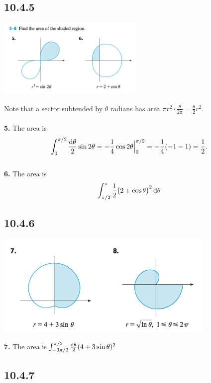 \subsection*{10.4.5}
\includegraphics[width=200pt]{img/10-4-5-6.png}
\begin{mdframed}
  Note that a sector subtended by $\theta$ radians has area
  $\pi r^2 \cdot \frac{\theta}{2\pi} = \frac{\theta}{2}r^2$.\\\\
  \textbf{5.} The area is
  \begin{align*}
    \int_0^{\pi/2} \frac{\d\theta}{2}\sin2\theta = -\frac{1}{4}\cos2\theta\Big|_0^{\pi/2} = -\frac{1}{4}(-1 - 1) = \frac{1}{2}.
  \end{align*}\\
  \textbf{6.} The area is
  \begin{align*}
    \int_{\pi/2}^\pi \frac{1}{2}\big(2 + \cos\theta\big)^2 \d\theta\\
  \end{align*}
\end{mdframed}

\subsection*{10.4.6}
\includegraphics[width=300pt]{img/10-4-7-8.png}
\begin{mdframed}
  \textbf{7.} The area is $\int_{-3\pi/2}^{\pi/2}\frac{\d\theta}{2}(4 + 3\sin\theta)^2$
\end{mdframed}

\subsection*{10.4.7}
